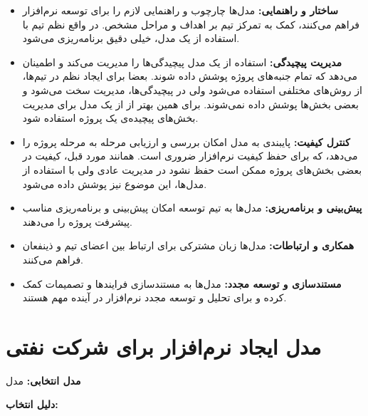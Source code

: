 \begin{itemize}
	\item \textbf{ساختار و راهنمایی:}
	مدل‌ها چارچوب و راهنمایی لازم را برای توسعه نرم‌افزار فراهم می‌کنند، کمک به تمرکز تیم بر اهداف و مراحل مشخص. در واقع نظم تیم با استفاده از یک مدل، خیلی دقیق برنامه‌ریزی می‌شود.
	\item \textbf{مدیریت پیچیدگی:}
	استفاده از یک مدل پیچیدگی‌ها را مدیریت می‌کند و اطمینان می‌دهد که تمام جنبه‌های پروژه پوشش داده شوند. بعضا برای ایجاد نظم در تیم‌ها، از روش‌های مختلفی استفاده می‌شود ولی در پیچیدگی‌ها، مدیریت سخت می‌شود و بعضی بخش‌ها پوشش داده نمی‌شوند. برای همین بهتر از از یک مدل برای مدیریت بخش‌های پیچیده‌ی یک پروژه استفاده شود.
	\item \textbf{کنترل کیفیت:}
	پایبندی به مدل امکان بررسی و ارزیابی مرحله به مرحله پروژه را می‌دهد، که برای حفظ کیفیت نرم‌افزار ضروری است. همانند مورد قبل، کیفیت در بعضی بخش‌های پروژه ممکن است حفظ نشود در مدیریت عادی ولی با استفاده از مدل‌ها، این موضوع نیز پوشش داده می‌شود.
	\item \textbf{پیش‌بینی و برنامه‌ریزی:}
	مدل‌ها به تیم توسعه امکان پیش‌بینی و برنامه‌ریزی مناسب پیشرفت پروژه را می‌دهند.
	\item \textbf{همکاری و ارتباطات:}
	مدل‌ها زبان مشترکی برای ارتباط بین اعضای تیم و ذینفعان فراهم می‌کنند.
	\item \textbf{مستندسازی و توسعه مجدد:}
	مدل‌ها به مستندسازی فرایندها و تصمیمات کمک کرده و برای تحلیل و توسعه مجدد نرم‌افزار در آینده مهم هستند.
\end{itemize}

\section*{ مدل ایجاد نرم‌افزار برای شرکت نفتی}
\textbf{مدل انتخابی:}
مدل

\textbf{دلیل انتخاب:}

